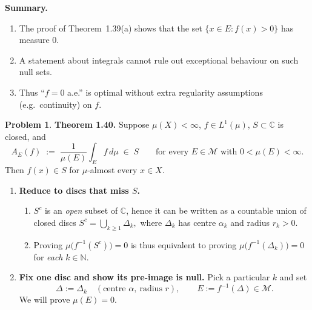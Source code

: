 \documentclass[12pt]{article}
\theoremstyle{definition} %
\newtheorem{problem}{Problem}
\theoremstyle{plain} %
\begin{document}
\noindent\textbf{Summary.}
\begin{enumerate}
  \item The proof of Theorem~1.39(a) shows that the set
        $\{x\in E:f(x)>0\}$ has measure\/ $0$.
  \item A statement about integrals cannot rule out exceptional
        behaviour on such null sets.
  \item Thus ``$f=0$ a.e.'' is optimal without extra regularity
        assumptions (e.g.\ continuity) on $f$.
\end{enumerate}
\pagebreak
\begin{problem}
  \textbf{Theorem 1.40.}
  Suppose $\mu(X)<\infty$, $f\in L^{1}(\mu)$, $S\subset\mathbb{C}$ is
  closed, and
  \[
      A_{E}(f)
      \;:=\;
      \frac{1}{\mu(E)}\int_{E}f\,d\mu
      \;\in\;S
      \qquad
      \text{for every }E\in\mathcal{M}\text{ with }0<\mu(E)<\infty.
  \]
  Then $f(x)\in S$ for $\mu$-almost every $x\in X$.

  \begin{enumerate}
      \item \textbf{Reduce to discs that miss $S$.}\label{step:discs}
            \begin{enumerate}
                \item $S^{c}$ is an \emph{open} subset of $\mathbb{C}$,
                      hence it can be written as a countable union of
                      closed discs  
                      \(
                          S^{c}=\bigcup_{k\ge1}\Delta_{k},
                      \)
                      where $\Delta_{k}$ has centre $\alpha_{k}$ and radius $r_{k}>0$.
                \item Proving $\mu\!\bigl(f^{-1}(S^{c})\bigr)=0$
                      is thus equivalent to proving
                      $\mu\!\bigl(f^{-1}(\Delta_{k})\bigr)=0$ for
                      \emph{each} $k\in\mathbb{N}$.
            \end{enumerate}

      \item \textbf{Fix one disc and show its pre-image is null.}
            Pick a particular $k$ and set
            \[
                \Delta:=\Delta_{k}
                \quad(\text{centre }\alpha,\ \text{radius }r),
                \qquad
                E:=f^{-1}(\Delta)\in\mathcal{M}.
            \]
            We will prove $\mu(E)=0$.


\end{enumerate}
\end{problem}
\end{document}
